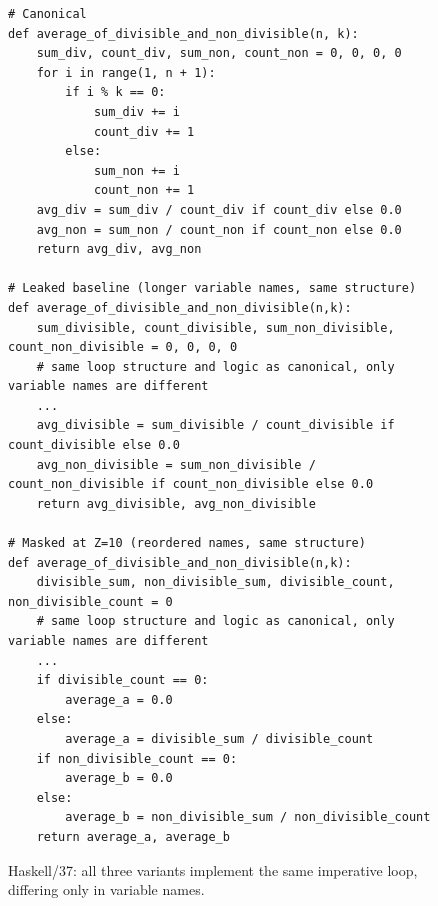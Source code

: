 \documentclass[mscthesis]{usiinfthesis}
\begin{document}
\begin{figure}[h]
\begin{lstlisting}[style=pythonstyle2]
# Canonical
def average_of_divisible_and_non_divisible(n, k):
    sum_div, count_div, sum_non, count_non = 0, 0, 0, 0
    for i in range(1, n + 1):
        if i % k == 0:
            sum_div += i
            count_div += 1
        else:
            sum_non += i
            count_non += 1
    avg_div = sum_div / count_div if count_div else 0.0
    avg_non = sum_non / count_non if count_non else 0.0
    return avg_div, avg_non
 
# Leaked baseline (longer variable names, same structure)
def average_of_divisible_and_non_divisible(n,k):
    sum_divisible, count_divisible, sum_non_divisible, count_non_divisible = 0, 0, 0, 0
    # same loop structure and logic as canonical, only variable names are different
    ...
    avg_divisible = sum_divisible / count_divisible if count_divisible else 0.0
    avg_non_divisible = sum_non_divisible / count_non_divisible if count_non_divisible else 0.0
    return avg_divisible, avg_non_divisible
 
# Masked at Z=10 (reordered names, same structure)
def average_of_divisible_and_non_divisible(n,k):
    divisible_sum, non_divisible_sum, divisible_count, non_divisible_count = 0
    # same loop structure and logic as canonical, only variable names are different
    ...
    if divisible_count == 0:
        average_a = 0.0
    else:
        average_a = divisible_sum / divisible_count
    if non_divisible_count == 0:
        average_b = 0.0
    else:
        average_b = non_divisible_sum / non_divisible_count
    return average_a, average_b
\end{lstlisting}
\caption{Haskell/37: all three variants implement the same imperative loop, differing only in variable names.}
\label{fig:haskell37}
\end{figure}
\end{document}

